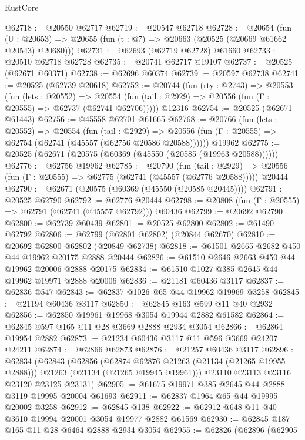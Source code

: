 \begin{lexlean}{RustCore}
\begin{coremodule}
@62718 := @20550 @62717
@62719 := @20547 @62718
@62728 := @20654
    (fun (U : @20653) => @20655 (fun (t : @7) => @20663 (@20525 (@20669 @61662 @20543) @20680)))
@62731 := @62693 (@62719 @62728) @61660
@62733 := @20510 @62718 @62728
@62735 := @20741 @62717 @19107
@62737 := @20525 (@62671 @60371)
@62738 := @62696 @60374
@62739 := @20597 @62738
@62741 := @20525 (@62739 @20618)
@62752 := @20744
    (fun (rty : @2743) =>
    @20553
      (fun (lets : @20552) =>
      @20554 (fun (tail : @2929) => @20556 (fun (Γ : @20555) => @62737 (@62741 @62706)))))
    @12316
@62754 := @20525 (@62671 @61443)
@62756 := @45558 @62701 @61665
@62768 := @20766
    (fun (lets : @20552) =>
    @20554
      (fun (tail : @2929) =>
      @20556 (fun (Γ : @20555) => @62754 (@62741 (@45557 (@62756 @20586 @20588))))))
    @19962
@62775 := @20525 (@62671 (@20575 (@60369 (@45550 (@20585 (@19963 @20588))))))
@62776 := @62756 @19962
@62785 := @20790
    (fun (tail : @2929) => @20556 (fun (Γ : @20555) => @62775 (@62741 (@45557 (@62776 @20588)))))
    @20444
@62790 := @62671 (@20575 (@60369 (@45550 (@20585 @20445))))
@62791 := @20525 @62790
@62792 := @62776 @20444
@62798 := @20808 (fun (Γ : @20555) => @62791 (@62741 (@45557 @62792))) @60436
@62799 := @20692 @62790
@62800 := @62739 @60439
@62801 := @20525 @62800
@62802 := @61490 @62792
@62806 := @62799 (@62801 @62802) (@20844 @62670)
@62810 := @20692 @62800 @62802 (@20849 @62738)
@62818 := @61501 @2665 @2682 @450 @44 @19962 @20175 @2888 @20444
@62826 := @61510 @2646 @2663 @450 @44 @19962 @20006 @2888 @20175
@62834 := @61510 @1027 @385 @2645 @44 @19962 @19971 @2888 @20006
@62836 := @21181 @60436 @3117
@62837 := @62836 @547
@62843 := @62837 @1026 @65 @44 @19962 @19969 @3258
@62845 := @21194 @60436 @3117
@62850 := @62845 @163 @599 @11 @40 @2932
@62856 := @62850 @19961 @19968 @3054 @19944 @2882 @61582
@62864 := @62845 @597 @165 @11 @28 @3669 @2888 @2934 @3054
@62866 := @62864 @19954 @2882
@62873 := @21234 @60436 @3117 @11 @596 @3669 @24207 @24211
@62874 := @62866 @62873
@62876 := @21257 @60436 @3117
@62896 := @62834
    (@62843
      (@62856
        (@62874 @62876 @21263 (@21134 (@21265 @19955 @2888)))
        @21263
        (@21134 (@21265 @19945 @19961)))
      @23110
      @23113
      @23116
      @23120
      @23125
      @23131)
@62905 := @61675 @19971 @385 @2645 @44 @2888 @3119 @19995 @20004 @61693
@62911 := @62837 @1964 @65 @44 @19995 @20002 @3258
@62912 := @62845 @138
@62922 := @62912 @648 @11 @40 @3610 @19994 @20001 @3054 @19977 @2882 @61569
@62930 := @62845 @187 @165 @11 @28 @6464 @2888 @2934 @3054
@62955 := @62826
    (@62896
      (@62905

\end{coremodule}
\end{lexlean}
